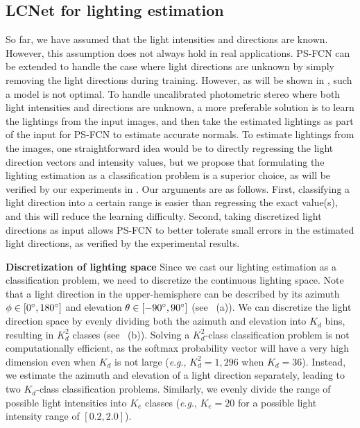 \documentclass[10pt,journal,compsoc]{IEEEtran}
\newcommand{\eg}{\textit{e}.\textit{g}.}
\newcommand{\rev}[1]{#1}
\renewcommand{\paragraph}[1]{\vspace{0.2em}\noindent \textbf{#1 \hspace{0.2em}}}
\begin{document}
\subsection{LCNet for lighting estimation}
So far, we have assumed that the light intensities and directions are known. However, this assumption does not always hold in real applications. PS-FCN can be extended to handle the case where light directions are unknown by simply removing the light directions during training. However, as will be shown in , such a model is not optimal. To handle uncalibrated photometric stereo where both light intensities and directions are unknown, a more preferable solution is to learn the lightings from the input images, and then take the estimated lightings as part of the input for PS-FCN to estimate accurate normals.
To estimate lightings from the images, one straightforward idea would be to directly regressing the light direction vectors and intensity values, but we propose that formulating the lighting estimation as a classification problem is a superior choice, as will be verified by our experiments in . Our arguments are as follows. First, classifying a light direction into a certain range is easier than regressing the exact value(s), and this will reduce the learning difficulty. 
\rev{Second, taking discretized light directions as input allows PS-FCN to better tolerate small errors in the estimated light directions, as verified by the experimental results.}

\paragraph{Discretization of lighting space} Since we cast our lighting estimation as a classification problem, we need to discretize the continuous lighting space. Note that a light direction in the upper-hemisphere can be described by its azimuth $\phi \in [0\degree, 180\degree]$ and elevation $\theta \in [-90\degree, 90\degree]$ (see ~(a)). We can discretize the light direction space by evenly dividing both the azimuth and elevation into $K_d$ bins, resulting in $K_d^2$ classes (see ~(b)). Solving a $K_d^2$-class classification problem is not computationally efficient, as the softmax probability vector will have a very high dimension even when $K_d$ is not large (\eg, $K_d^2=1,296$ when $K_d=36$). 
Instead, we estimate the azimuth and elevation of a light direction separately, leading to two $K_d$-class classification problems. Similarly, we evenly divide the range of possible light intensities into $K_e$ classes (\eg, $K_e=20$ for a possible light intensity range of $[0.2, 2.0]$).
\end{document}
